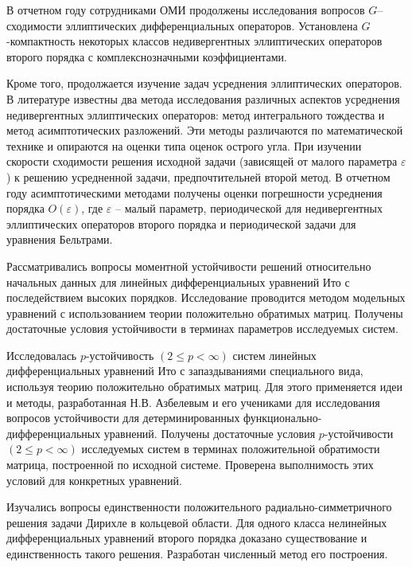 \Conclusion




В отчетном году сотрудниками ОМИ продолжены исследования вопросов $G$--сходимости %
эллиптических дифференциальных операторов. %
Установлена $G$-компактность некоторых классов недивергентных эллиптических операторов второго порядка с комплекснозначными коэффициентами.

Кроме того, продолжается изучение задач усреднения эллиптических операторов. 
В литературе известны два метода исследования различных аспектов усреднения недивергентных эллиптических операторов: метод интегрального тождества и метод асимптотических разложений. Эти методы различаются по математической технике и опираются на оценки типа оценок острого угла. При изучении скорости сходимости решения исходной задачи (зависящей от малого параметра $\varepsilon$) к решению усредненной задачи, предпочтительней второй метод.
В отчетном году асимптотическими методами получены оценки погрешности усреднения порядка $O(\varepsilon)$, где $\varepsilon$ -- малый параметр, периодической 
для недивергентных эллиптических операторов второго порядка и периодической задачи для уравнения Бельтрами.


Рассматривались вопросы моментной устойчивости решений относительно начальных данных для линейных дифференциальных уравнений Ито с последействием высоких порядков. Исследование проводится методом модельных уравнений с использованием теории положительно обратимых матриц. Получены достаточные условия устойчивости в терминах параметров исследуемых систем.

Исследовалась $p$-устойчивость $(2 \le p < \infty)$ систем линейных дифференциальных уравнений Ито с запаздываниями специального вида, используя теорию положительно обратимых матриц. Для этого применяется идеи и методы, разработанная Н.В. Азбелевым и его учениками для исследования вопросов устойчивости для детерминированных функционально-дифференциальных уравнений. Получены достаточные условия $p$-устойчивости $(2 \le p < \infty)$ исследуемых систем в терминах положительной обратимости матрица, построенной по исходной системе. Проверена  выполнимость этих условий для конкретных уравнений.



Изучались вопросы 
единственности положительного радиально-симметричного решения задачи Дирихле в кольцевой
области. 
Для одного класса нелинейных дифференциальных уравнений второго порядка доказано существование и единственность такого решения. 
Разработан численный метод его построения.









